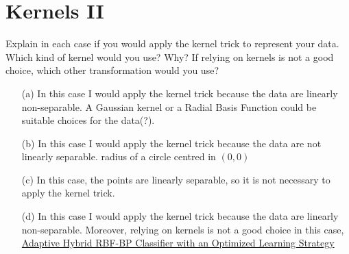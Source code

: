 \section{Kernels II}

Explain in each case if you would apply the kernel trick to represent your 
data. Which kind of kernel would you use? Why? If relying on kernels is not 
a good choice, which other transformation would you use?
\begin{itemize}
	\item[(a)] In this case I would apply the kernel trick because the data are 
	linearly non-separable. %
	A Gaussian kernel or a Radial Basis Function could be suitable choices for 
	the data(?).
	\item[(b)] In this case I would apply the kernel trick because the data are 
	not linearly separable.  
	radius of a circle centred in $(0, 0)$
	\item[(c)] In this case, the points are linearly separable, so it is not 
	necessary to apply the kernel trick.  
	\item[(d)] In this case I would apply the kernel trick because the data 
	are linearly non-separable. Moreover, relying on kernels is not 
	a good choice in this case, \\
	\href{https://www.researchgate.net/publication/309545761\_A\_Structure- 
	Adaptive\_Hybrid\_RBF-BP\_Classifier\_with\_an\_Optimized\_Learning\_Strategy}{Adaptive
	 Hybrid RBF-BP Classifier with an Optimized Learning Strategy}
\end{itemize}
